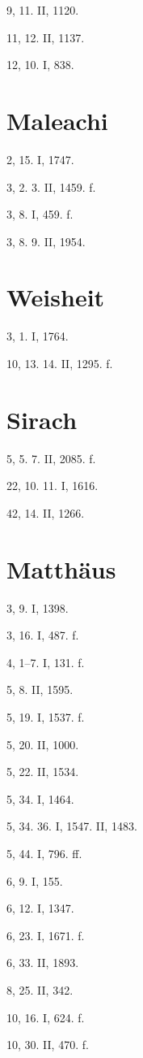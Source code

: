 9, 11. II, 1120.

11, 12. II, 1137.

12, 10. I, 838.

\section{Maleachi}

2, 15. I, 1747.

3, 2. 3. II, 1459. f.

3, 8. I, 459. f.

3, 8. 9. II, 1954.

\section{Weisheit}

3, 1. I, 1764.

10, 13. 14. II, 1295. f.

\section{Sirach}

5, 5. 7. II, 2085. f.

22, 10. 11. I, 1616.

42, 14. II, 1266.

\section{Matthäus}

3, 9. I, 1398.

3, 16. I, 487. f.

4, 1–7. I, 131. f.

5, 8. II, 1595.

5, 19. I, 1537. f.

5, 20. II, 1000.

5, 22. II, 1534.

5, 34. I, 1464.

5, 34. 36. I, 1547. II, 1483.

5, 44. I, 796. ff.

6, 9. I, 155.

6, 12. I, 1347.

6, 23. I, 1671. f.

6, 33. II, 1893.

8, 25. II, 342.

10, 16. I, 624. f.

10, 30. II, 470. f.

